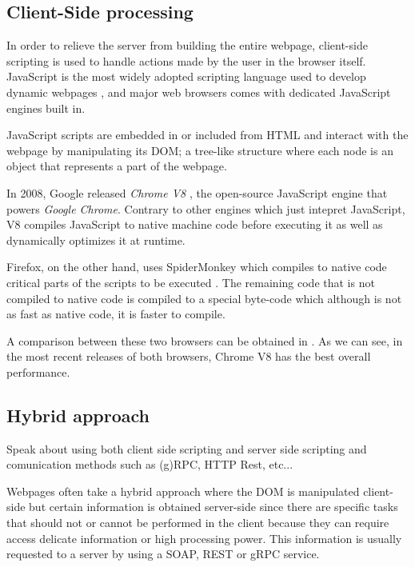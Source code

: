 \subsection{Client-Side processing}
In order to relieve the server from building the entire webpage, client-side scripting is used to handle actions made by the user in the browser itself. JavaScript is the most widely adopted scripting language used to develop dynamic webpages \cite{js_stats}, and major web browsers comes with dedicated JavaScript engines built in.  

JavaScript scripts are embedded in or included from HTML and interact with the webpage by manipulating its DOM; a tree-like structure where each node is an object that represents a part of the webpage. 

In 2008, Google released \textit{Chrome V8} \cite{chrome_v8}, the open-source JavaScript engine that powers \textit{Google Chrome}. Contrary to other engines which just intepret JavaScript, V8 compiles JavaScript to native machine code before executing it as well as dynamically optimizes it at runtime.

Firefox, on the other hand, uses SpiderMonkey which compiles to native code critical parts of the scripts to be executed \cite{tampermoneky}. The remaining code that is not compiled to native code is compiled to a special byte-code which although is not as fast as native code, it is faster to compile.

A comparison between these two browsers can be obtained in \cite{firefox_benchmark}. As we can see, in the most recent releases of both browsers, Chrome V8 has the best overall performance.

\subsection{Hybrid approach}
Speak about using both client side scripting and server side scripting and comunication methods such as (g)RPC, HTTP Rest, etc...

Webpages often take a hybrid approach where the DOM is manipulated client-side but certain information is obtained server-side since there are specific tasks that should not or cannot be performed in the client because they can require access delicate information or high processing power. This information is usually requested to a server by using a SOAP, REST or gRPC service.

